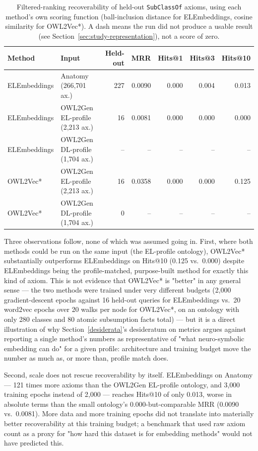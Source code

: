 \begin{table}[htbp]
\centering
\caption{Filtered-ranking recoverability of held-out \texttt{SubClassOf} axioms, using each method's own scoring function (ball-inclusion distance for ELEmbeddings, cosine similarity for OWL2Vec*). A dash means the run did not produce a usable result (see Section~\ref{sec:study-representation}), not a score of zero.}
\label{tab:nesy-validation-study}
\begin{tabular}{llrrrrr}
\toprule
Method & Input & Held-out & MRR & Hits@1 & Hits@3 & Hits@10 \\
\midrule
ELEmbeddings & Anatomy (266{,}701 ax.)      & 227 & 0.0090 & 0.000 & 0.004 & 0.013 \\
ELEmbeddings & OWL2Gen EL-profile (2{,}213 ax.) & 16  & 0.0081 & 0.000 & 0.000 & 0.000 \\
ELEmbeddings & OWL2Gen DL-profile (1{,}704 ax.) & --  & --     & --    & --    & --    \\
\midrule
OWL2Vec* & OWL2Gen EL-profile (2{,}213 ax.) & 16 & 0.0358 & 0.000 & 0.000 & 0.125 \\
OWL2Vec* & OWL2Gen DL-profile (1{,}704 ax.) & 0  & --     & --    & --    & --    \\
\bottomrule
\end{tabular}
\end{table}

Three observations follow, none of which was assumed going in. First, where both methods could be run on the same input (the EL-profile ontology), OWL2Vec* substantially outperforms ELEmbeddings on Hits@10 (0.125 vs.\ 0.000) despite ELEmbeddings being the profile-matched, purpose-built method for exactly this kind of axiom. This is not evidence that OWL2Vec* is "better" in any general sense — the two methods were trained under very different budgets (2{,}000 gradient-descent epochs against 16 held-out queries for ELEmbeddings vs.\ 20 word2vec epochs over 20 walks per node for OWL2Vec*, on an ontology with only 280 classes and 80 atomic subsumption facts total) — but it is a direct illustration of why Section~\ref{desiderata}'s desideratum on metrics argues against reporting a single method's numbers as representative of "what neuro-symbolic embedding can do" for a given profile: architecture and training budget move the number as much as, or more than, profile match does.

Second, scale does not rescue recoverability by itself. ELEmbeddings on Anatomy — 121 times more axioms than the OWL2Gen EL-profile ontology, and 3{,}000 training epochs instead of 2{,}000 — reaches Hits@10 of only 0.013, worse in absolute terms than the small ontology's 0.000-but-comparable MRR (0.0090 vs.\ 0.0081). More data and more training epochs did not translate into materially better recoverability at this training budget; a benchmark that used raw axiom count as a proxy for "how hard this dataset is for embedding methods" would not have predicted this.

